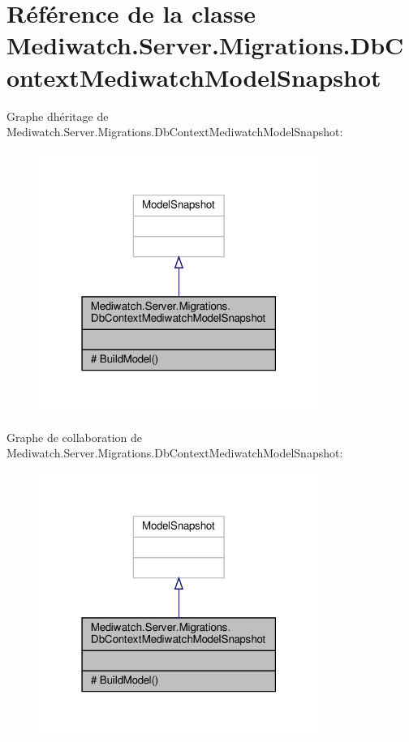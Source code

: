 \hypertarget{class_mediwatch_1_1_server_1_1_migrations_1_1_db_context_mediwatch_model_snapshot}{}\section{Référence de la classe Mediwatch.\+Server.\+Migrations.\+Db\+Context\+Mediwatch\+Model\+Snapshot}
\label{class_mediwatch_1_1_server_1_1_migrations_1_1_db_context_mediwatch_model_snapshot}


Graphe d\textquotesingle{}héritage de Mediwatch.\+Server.\+Migrations.\+Db\+Context\+Mediwatch\+Model\+Snapshot\+:\nopagebreak
\begin{figure}[H]
\begin{center}
\leavevmode
\includegraphics[width=259pt]{class_mediwatch_1_1_server_1_1_migrations_1_1_db_context_mediwatch_model_snapshot__inherit__graph}
\end{center}
\end{figure}


Graphe de collaboration de Mediwatch.\+Server.\+Migrations.\+Db\+Context\+Mediwatch\+Model\+Snapshot\+:\nopagebreak
\begin{figure}[H]
\begin{center}
\leavevmode
\includegraphics[width=259pt]{class_mediwatch_1_1_server_1_1_migrations_1_1_db_context_mediwatch_model_snapshot__coll__graph}
\end{center}
\end{figure}
